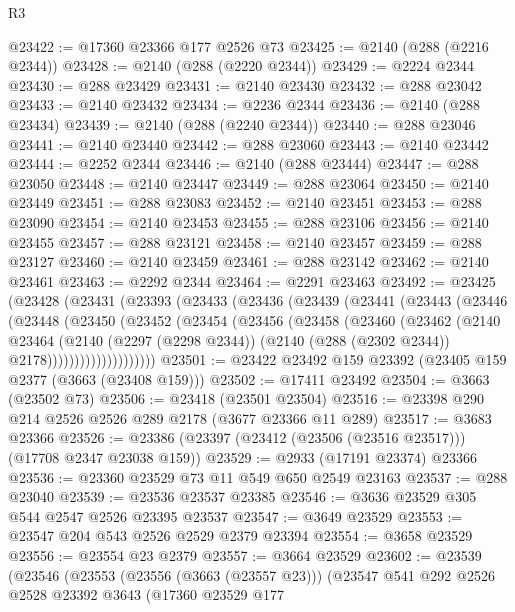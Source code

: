 \begin{lexlean}{R3}
\begin{coremodule}
@23422 := @17360 @23366 @177 @2526 @73
@23425 := @2140 (@288 (@2216 @2344))
@23428 := @2140 (@288 (@2220 @2344))
@23429 := @2224 @2344
@23430 := @288 @23429
@23431 := @2140 @23430
@23432 := @288 @23042
@23433 := @2140 @23432
@23434 := @2236 @2344
@23436 := @2140 (@288 @23434)
@23439 := @2140 (@288 (@2240 @2344))
@23440 := @288 @23046
@23441 := @2140 @23440
@23442 := @288 @23060
@23443 := @2140 @23442
@23444 := @2252 @2344
@23446 := @2140 (@288 @23444)
@23447 := @288 @23050
@23448 := @2140 @23447
@23449 := @288 @23064
@23450 := @2140 @23449
@23451 := @288 @23083
@23452 := @2140 @23451
@23453 := @288 @23090
@23454 := @2140 @23453
@23455 := @288 @23106
@23456 := @2140 @23455
@23457 := @288 @23121
@23458 := @2140 @23457
@23459 := @288 @23127
@23460 := @2140 @23459
@23461 := @288 @23142
@23462 := @2140 @23461
@23463 := @2292 @2344
@23464 := @2291 @23463
@23492 := @23425
    (@23428
      (@23431
        (@23393
          (@23433
            (@23436
              (@23439
                (@23441
                  (@23443
                    (@23446
                      (@23448
                        (@23450
                          (@23452
                            (@23454
                              (@23456
                                (@23458
                                  (@23460
                                    (@23462
                                      (@2140
                                        @23464
                                        (@2140
                                          (@2297 (@2298 @2344))
                                          (@2140 (@288 (@2302 @2344)) @2178))))))))))))))))))))
@23501 := @23422 @23492 @159 @23392 (@23405 @159 @2377 (@3663 (@23408 @159)))
@23502 := @17411 @23492
@23504 := @3663 (@23502 @73)
@23506 := @23418 (@23501 @23504)
@23516 := @23398 @290 @214 @2526 @2526 @289 @2178 (@3677 @23366 @11 @289)
@23517 := @3683 @23366
@23526 := @23386 (@23397 (@23412 (@23506 (@23516 @23517))) (@17708 @2347 @23038 @159))
@23529 := @2933 (@17191 @23374) @23366
@23536 := @23360 @23529 @73 @11 @549 @650 @2549 @23163
@23537 := @288 @23040
@23539 := @23536 @23537 @23385
@23546 := @3636 @23529 @305 @544 @2547 @2526 @23395 @23537
@23547 := @3649 @23529
@23553 := @23547 @204 @543 @2526 @2529 @2379 @23394
@23554 := @3658 @23529
@23556 := @23554 @23 @2379
@23557 := @3664 @23529
@23602 := @23539
    (@23546
      (@23553
        (@23556 (@3663 (@23557 @23)))
        (@23547
          @541
          @292
          @2526
          @2528
          @23392
          @3643
          (@17360
            @23529
            @177

\end{coremodule}
\end{lexlean}
